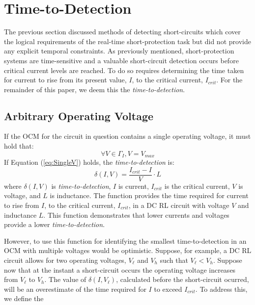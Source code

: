 \documentclass[11pt,oneside]{report}
\begin{document}
    \section{Time-to-Detection}
    The previous section discussed methods of detecting short-circuits which cover the logical requirements of the real-time short-protection task but did not provide any explicit temporal constraints. As previously mentioned, short-protection systems are time-sensitive and a valuable short-circuit detection occurs before critical current levels are reached. To do so requires determining the time taken for current to rise from its present value, $I$, to the critical current, $I_{crit}$. For the remainder of this paper, we deem this the \textit{time-to-detection}.
    
    \subsection{Arbitrary Operating Voltage}
    If the OCM for the circuit in question contains a single operating voltage, it must hold that:
    \begin{equation}\label{eq:SingleV}
    \forall  V  \in \Gamma_{I}, V = V_{max}
    \end{equation}
    If Equation (\ref{eq:SingleV}) holds, the \textit{time-to-detection}  is:
    \begin{equation}\label{eq:TimeToDetect}
    \delta(I,V) = \frac{I_{crit}-I}{V}\cdot L
    \end{equation}
    where $\delta(I,V)$ is \textit{time-to-detection}, $I$ is current, $I_{crit}$ is the critical current, $V$ is voltage, and $L$ is inductance. The function provides the time required for current to rise from $I$, to the critical current, $I_{crit}$, in a DC RL circuit with voltage $V$ and inductance $L$. This function demonstrates that lower currents and voltages provide a lower \textit{time-to-detection}.
     
    However, to use this function for identifying the smallest time-to-detection in an OCM with multiple voltages would be optimistic. Suppose, for example, a DC RL circuit allows for two operating voltages, $V_\ell$ and $V_h$ such that $V_\ell < V_h$. Suppose now that at the instant a short-circuit occurs the operating voltage increases from $V_\ell$ to $V_h$. The value of $\delta(I,V_\ell)$, calculated before the short-circuit ocurred, will be an overestimate of the time required for $I$ to exceed $I_{crit}$. To address this, we define the 
    
\end{document}
